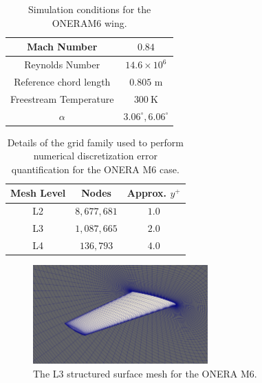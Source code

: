 \begin{table}
\centering
    \renewcommand{\arraystretch}{1.2}
    \captionsetup{justification=centering}
    \caption{Simulation conditions for the ONERAM6 wing.} 
    \begin{tabular}{|c|c|}
        \hline
        Mach Number & $0.84$ \\ \hline
        Reynolds Number & $14.6\times10^6$ \\ \hline
        Reference chord length & $0.805$ m \\ \hline
        Freestream Temperature & $300~\text{K}$ \\ \hline
        $\alpha$ & $3.06^\circ, 6.06^\circ$ \\ \hline 
    \end{tabular}
    \label{tab:ONERAM6_test_cond}
\end{table}

\begin{table}
    \renewcommand{\arraystretch}{1.2}
    \centering
    \begin{tabular}{ c|c|c } 
         Mesh Level & Nodes & Approx. $y^+$  \\ 
         \hline
         L2 & $8,677,681$ &  $1.0$\\
         L3 & $1,087,665$ &  $2.0$\\
         L4 & $136,793$ & $4.0$\\
        
    \end{tabular}
    \caption{Details of the grid family used to perform numerical discretization error quantification for the ONERA M6 case.}
    \label{tab:oneram6_meshes}
\end{table}

\begin{figure}
\center
\includegraphics[width=0.6\textwidth]{code/image_gen/oneram6/images/oneram6_L3_mesh.png}
\caption{The L3 structured surface mesh for the ONERA M6. \label{fig:oneram6_mesh}}
\end{figure}

